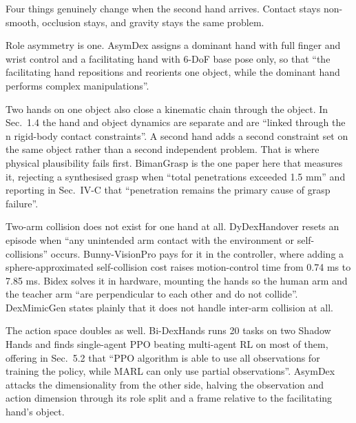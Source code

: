 Four things genuinely change when the second hand arrives.
Contact stays non-smooth, occlusion stays, and gravity stays the same problem.

Role asymmetry is one. AsymDex \cite{asymdex_2024} assigns a dominant hand with full finger and
wrist control and a facilitating hand with 6-DoF base pose only, so that ``the facilitating hand
repositions and reorients one object, while the dominant hand performs complex manipulations''.

Two hands on one object also close a kinematic chain through the object. In
\cite{bicchi_grasping_chapter_2001} Sec.~1.4 the hand and object dynamics are separate and are
``linked through the n rigid-body contact constraints''. A second hand adds a second constraint
set on the same object rather than a second independent problem. That is where physical
plausibility fails first. BimanGrasp \cite{bimangrasp_2024} is the one paper here that measures it,
rejecting a synthesised grasp when ``total penetrations exceeded 1.5 mm'' and reporting in
Sec.~IV-C that ``penetration remains the primary cause of grasp failure''.

Two-arm collision does not exist for one hand at all. DyDexHandover \cite{dydexhandover_2025}
resets an episode when ``any unintended arm contact with the environment or self-collisions''
occurs. Bunny-VisionPro \cite{bunny_visionpro_2024} pays for it in the controller, where adding a
sphere-approximated self-collision cost raises motion-control time from 0.74 ms to 7.85 ms. Bidex
\cite{bidex_teleop_2024} solves it in hardware, mounting the hands so the human arm and the
teacher arm ``are perpendicular to each other and do not collide''. DexMimicGen
\cite{dexmimicgen_2024} states plainly that it does not handle inter-arm collision at all.

The action space doubles as well. Bi-DexHands \cite{bidexhands_2022} runs 20 tasks on two Shadow Hands
and finds single-agent PPO beating multi-agent RL on most of them, offering in Sec.~5.2 that ``PPO
algorithm is able to use all observations for training the policy, while MARL can only use partial
observations''. AsymDex \cite{asymdex_2024} attacks the dimensionality from the other side,
halving the observation and action dimension through its role split and a frame relative to the
facilitating hand's object.

